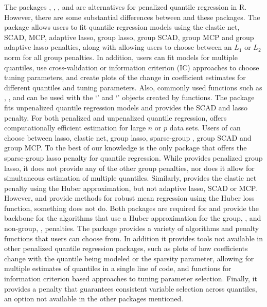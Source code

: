 The packages , , , and  are alternatives for penalized quantile regression in R. However, there are some substantial differences between  and these packages. The package  allows users to fit quantile regression models using the elastic net, SCAD, MCP, adaptive lasso, group lasso, group SCAD, group MCP and group adaptive lasso penalties, along with allowing users to choose between an \(L_1\) or \(L_2\) norm for all group penalties. In addition, users can fit models for multiple quantiles, use cross-validation or information criterion (IC) approaches to choose tuning parameters, and create plots of the change in coefficient estimates for different quantiles and tuning parameters. Also, commonly used functions such as , , and  can be used with the `' and `' objects created by  functions. The package  fits unpenalized quantile regression models and provides the SCAD and lasso penalty. For both penalized and unpenalized quantile regression,  offers computationally efficient estimation for large \(n\) or \(p\) data sets. Users of  can choose between lasso, elastic net, group lasso, sparse-group \citep{sparseGroup}, group SCAD and group MCP. To the best of our knowledge  is the only package that offers the sparse-group lasso penalty for quantile regression. While  provides penalized group lasso, it does not provide any of the other group penalties, nor does it allow for simultaneous estimation of multiple quantiles. Similarly,  provides the elastic net penalty using the Huber approximation, but not adaptive lasso, SCAD or MCP. However,  and  provide methods for robust mean regression using the Huber loss function, something  does not do. Both packages are required for  and provide the backbone for the algorithms that use a Huber approximation for the group, , and non-group, , penalties. The package  provides a variety of algorithms and penalty functions that users can choose from. In addition it provides tools not available in other penalized quantile regression packages, such as plots of how coefficients change with the quantile being modeled or the sparsity parameter, allowing for multiple estimates of quantiles in a single line of code, and functions for information criterion based approaches to tuning parameter selection. Finally, it provides a penalty that guarantees consistent variable selection across quantiles, an option not available in the other packages mentioned.

